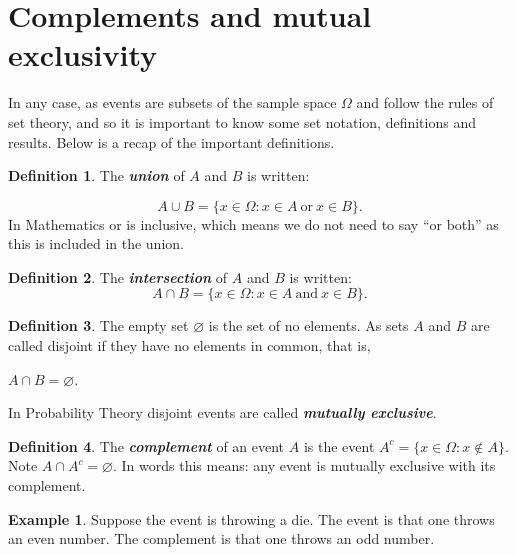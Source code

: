 \documentclass[
]{book}
\theoremstyle{definition}
\newtheorem{definition}{Definition}[chapter]
\theoremstyle{definition}
\newtheorem{example}{Example}[chapter]
\theoremstyle{definition}
\theoremstyle{definition}
\theoremstyle{remark}
\begin{document}
\hypertarget{complements-and-mutual-exclusivity}{%
\section{Complements and mutual exclusivity}\label{complements-and-mutual-exclusivity}}

In any case, as events are subsets of the sample space \(\Omega\) and follow the rules of set theory, and so it is important to know some set notation, definitions and results. Below is a recap of the important definitions.

\begin{definition}
\protect\hypertarget{def:union}{}\label{def:union}The \textbf{\emph{union}} of \(A\) and \(B\) is written:

\[A\cup B = \{ x \in \Omega :  x \in A \ \text{or} \ x\in B \}.\]
In Mathematics or is inclusive, which means we do not need to say ``or both'' as this is included in the union.
\end{definition}

\begin{definition}
\protect\hypertarget{def:intersection}{}\label{def:intersection}The \textbf{\emph{intersection}} of \(A\) and \(B\) is written:
\[A\cap B = \{ x \in \Omega:  x \in A \ \text{and} \ x\in B \}.\]
\end{definition}

\begin{definition}
\protect\hypertarget{def:mutex}{}\label{def:mutex}The empty set \(\varnothing\) is the set of no elements. As sets \(A\) and \(B\) are called disjoint if they have no elements in common, that is,

\(A \cap B = \varnothing.\)

In Probability Theory disjoint events are called \textbf{\emph{mutually exclusive}}.
\end{definition}

\begin{definition}
\protect\hypertarget{def:complement}{}\label{def:complement}The \textbf{\emph{complement}} of an event \(A\) is the event \(A^{c} = \{x \in \Omega : x\notin A\}.\)
Note \(A \cap A^{c} = \varnothing\). In words this means: any event is mutually exclusive with its complement.
\end{definition}

\begin{example}
Suppose the event is throwing a die. The event is that one throws an even number. The complement is that one throws an odd number.
\end{example}
\end{document}
